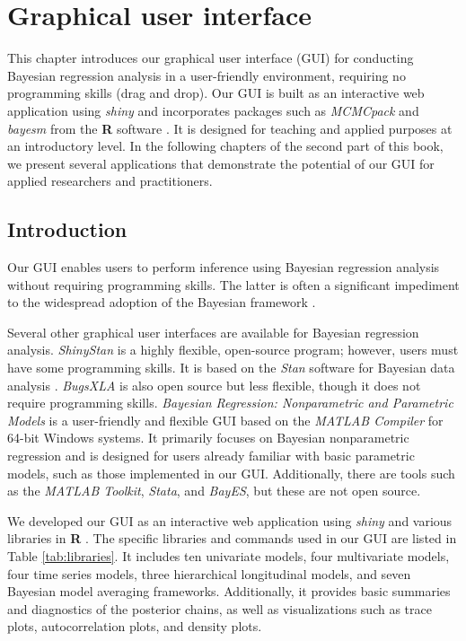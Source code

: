 \chapter{Graphical user interface}\label{chapGUI}

This chapter introduces our graphical user interface (GUI) for conducting Bayesian regression analysis in a user-friendly environment, requiring no programming skills (drag and drop). Our GUI is built as an interactive web application using \textit{shiny} \cite{Chang2018} and incorporates packages such as \textit{MCMCpack} \cite{Martin2018} and \textit{bayesm} \cite{Rossi2017} from the \textbf{R} software \cite{R2023}. It is designed for teaching and applied purposes at an introductory level. In the following chapters of the second part of this book, we present several applications that demonstrate the potential of our GUI for applied researchers and practitioners.

\section{Introduction}\label{secGUI1}

Our GUI enables users to perform inference using Bayesian regression analysis without requiring programming skills. The latter is often a significant impediment to the widespread adoption of the Bayesian framework \cite{Woodward2005,Karabatsos2016}.

Several other graphical user interfaces are available for Bayesian regression analysis. \textit{ShinyStan} \cite{shinystan2017} is a highly flexible, open-source program; however, users must have some programming skills. It is based on the \textit{Stan} software for Bayesian data analysis \cite{carpenter2017stan}. \textit{BugsXLA} \cite{Woodward2005} is also open source but less flexible, though it does not require programming skills. \textit{Bayesian Regression: Nonparametric and Parametric Models} \cite{Karabatsos2016} is a user-friendly and flexible GUI based on the \textit{MATLAB Compiler} for 64-bit Windows systems. It primarily focuses on Bayesian nonparametric regression and is designed for users already familiar with basic parametric models, such as those implemented in our GUI. Additionally, there are tools such as the \textit{MATLAB Toolkit}, \textit{Stata}, and \textit{BayES}, but these are not open source.

We developed our GUI as an interactive web application using \textit{shiny} \cite{Chang2018} and various libraries in \textbf{R} \cite{R2021}. The specific libraries and commands used in our GUI are listed in Table \ref{tab:libraries}. It includes ten univariate models, four multivariate models, four time series models, three hierarchical longitudinal models, and seven Bayesian model averaging frameworks. Additionally, it provides basic summaries and diagnostics of the posterior chains, as well as visualizations such as trace plots, autocorrelation plots, and density plots.

